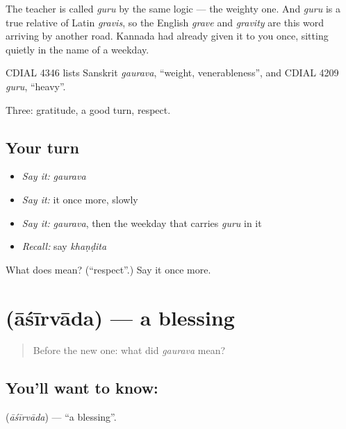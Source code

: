 The teacher is called \emph{guru} by the same logic — the weighty one. And \emph{guru} is a true relative of Latin \emph{gravis}, so the English \emph{grave} and \emph{gravity} are this word arriving by another road. Kannada had already given it to you once, sitting quietly in the name of a weekday.

CDIAL 4346 lists Sanskrit \emph{gaurava}, \textquotedblleft{}weight, venerableness\textquotedblright{}, and CDIAL 4209 \emph{guru}, \textquotedblleft{}heavy\textquotedblright{}.

\begin{grammarlens}[title={What you've built}]
Three: gratitude, a good turn, respect.
\end{grammarlens}

\subsection*{Your turn}
\begin{itemize}
\raggedright
  \item \emph{Say it:} \emph{gaurava}
  \item \emph{Say it:} it once more, slowly
  \item \emph{Say it:} \emph{gaurava}, then the weekday that carries \emph{guru} in it
  \item \emph{Recall:} say \emph{khaṇḍita}
\end{itemize}

\begin{tcolorbox}[breakable,colback=teal!4,colframe=teal!35!black,title={Before you move on}]
What does  mean? (\textquotedblleft{}respect\textquotedblright{}.) Say it once more.
\end{tcolorbox}
\section[\texorpdfstring{\kn{ಆಶೀರ್ವಾದ} (āśīrvāda)}{ಆಶೀರ್ವಾದ (āśīrvāda)}]{ (āśīrvāda) — a blessing}

\label{lesson:KA-C51-blessing}



\begin{quote}
Before the new one: what did \emph{gaurava} mean?
\end{quote}

\subsection*{You'll want to know: }
\textbf{} (\emph{āśīrvāda}) — \textquotedblleft{}a blessing\textquotedblright{}.


